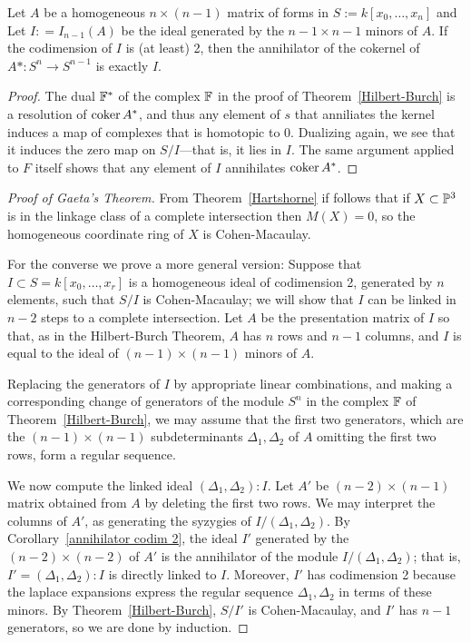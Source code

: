 \begin{corollary}\label{annihilator codim 2}
Let $A$ be a homogeneous $n\times (n-1)$ matrix of forms in $S := k[x_{0},\dots, x_{n}]$ and
Let  $I: = I_{n-1}(A)$ be the ideal generated by the $n-1\times n-1$ minors of $A$.
If the codimension of $I$ is (at least) 2, then the annihilator of the cokernel of $A*: S^{n}\to S^{n-1}$ is exactly $I$.
\end{corollary}

\begin{proof}
The dual ${\mathbb F}^*$ of the complex ${\mathbb F}$ in the proof of Theorem~\ref{Hilbert-Burch} is a resolution of ${\rm{coker}\,} A^*$, and thus any
element of $s$ that anniliates the kernel induces a map of complexes that is homotopic to 0. Dualizing again, we see
that it induces the zero map on $S/I$---that is, it lies in $I$. The same argument applied to $F$ itself shows that any element of
$I$ annihilates ${\rm{coker}\,} A^*$.
\end{proof}

\begin{proof}[Proof of Gaeta's Theorem]
From Theorem~\ref{Hartshorne} if follows that if $X\subset {\mathbb P}^3$ is in the linkage class of a complete intersection then $M(X) = 0$, so the homogeneous coordinate ring of $X$ is Cohen-Macaulay.

For the converse we prove a more general version: Suppose that $I\subset S= k[x_0,\dots,x_r]$ is a homogeneous ideal of codimension 2, generated by $n$ elements, such that $S/I$ is Cohen-Macaulay; we will show that $I$ can be linked in $n-2$ steps to a complete intersection. Let $A$ be the presentation matrix of $I$ so that, as in the Hilbert-Burch Theorem, $A$ has $n$ rows and $n-1$ columns, and $I$ is equal to the ideal of
$(n-1)\times (n-1)$ minors of $A$. 

Replacing the generators of $I$ by appropriate linear combinations, and making a corresponding change of generators of the 
module $S^n$ in the complex ${\mathbb F}$ of Theorem~\ref{Hilbert-Burch}, we may assume that the first two generators, which are the 
$(n-1)\times(n-1)$ subdeterminants $\Delta_1, \Delta_2$ of $A$ omitting the first two rows, form a regular sequence. 

We now compute the linked ideal $(\Delta_1,\Delta_2): I$. Let $A'$ be $(n-2)\times (n-1)$ matrix obtained from $A$ by
deleting the first two rows. We may interpret the columns of $A'$, as generating the syzygies
of $I/(\Delta_1, \Delta_2)$. By Corollary~\ref{annihilator codim 2}, the ideal $I'$ generated by the  $(n-2)\times(n-2)$ of $A'$ is
the annihilator of the module $I/(\Delta_1, \Delta_2)$; that is, $I' = (\Delta_1,\Delta_2): I$ is directly linked to $I$. Moreover, $I'$ has codimension 2 because
the laplace expansions express the regular sequence $\Delta_1, \Delta_2$ in terms of these minors. By Theorem~\ref{Hilbert-Burch},
$S/I'$ is Cohen-Macaulay, and $I'$ has $n-1$ generators, so we are done by induction.
\end{proof}


